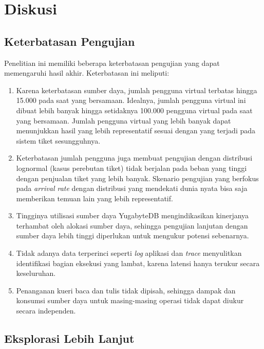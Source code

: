 \section{Diskusi}

\subsection{Keterbatasan Pengujian}
\label{keterbatasan-pengujian}

Penelitian ini memiliki beberapa keterbatasan pengujian yang dapat memengaruhi hasil akhir. Keterbatasan ini meliputi:

\begin{enumerate}
    \item Karena keterbatasan sumber daya, jumlah pengguna virtual terbatas hingga 15.000 pada saat yang bersamaan. Idealnya, jumlah pengguna virtual ini dibuat lebih banyak hingga setidaknya 100.000 pengguna virtual pada saat yang bersamaan. Jumlah pengguna virtual yang lebih banyak dapat menunjukkan hasil yang lebih representatif sesuai dengan yang terjadi pada sistem tiket sesungguhnya.
    \item Keterbatasan jumlah pengguna juga membuat pengujian dengan distribusi lognormal (kasus perebutan tiket) tidak berjalan pada beban yang tinggi dengan penjualan tiket yang lebih banyak. Skenario pengujian yang berfokus pada \textit{arrival rate} dengan distribusi yang mendekati dunia nyata bisa saja memberikan temuan lain yang lebih representatif.
    \item Tingginya utilisasi sumber daya YugabyteDB mengindikasikan kinerjanya terhambat oleh alokasi sumber daya, sehingga pengujian lanjutan dengan sumber daya lebih tinggi diperlukan untuk mengukur potensi sebenarnya.
    \item Tidak adanya data terperinci seperti \textit{log} aplikasi dan \textit{trace} menyulitkan identifikasi bagian eksekusi yang lambat, karena latensi hanya terukur secara keseluruhan.
    \item Penanganan kueri baca dan tulis tidak dipisah, sehingga dampak dan konsumsi sumber daya untuk masing-masing operasi tidak dapat diukur secara independen.
\end{enumerate}

\subsection{Eksplorasi Lebih Lanjut}
\label{pengembangan-lebih-lanjut}

